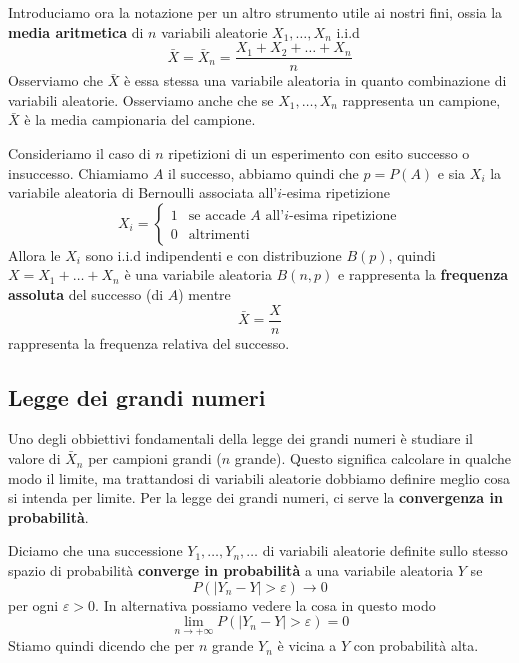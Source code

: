 Introduciamo ora la notazione per un altro strumento utile ai nostri fini, ossia la
\textbf{media aritmetica} di $n$ variabili aleatorie $X_1, \dots, X_n$ i.i.d
\[ \bar{X} = \bar{X}_n = \frac{X_1 + X_2 + \dots + X_n}{n} \]
Osserviamo che $\bar{X}$ è essa stessa una variabile aleatoria in quanto combinazione di
variabili aleatorie. Osserviamo anche che se $X_1, \dots, X_n$ rappresenta un campione,
$\bar{X}$ è la media campionaria del campione.

\begin{example}
	Consideriamo il caso di $n$ ripetizioni di un esperimento con esito successo o insuccesso.
	Chiamiamo $A$ il successo, abbiamo quindi che $p = P(A)$ e sia $X_i$ la variabile aleatoria di
	Bernoulli associata all'$i$-esima ripetizione
	\[
		X_i = \begin{cases}
			1 & \text{se accade $A$ all'$i$-esima ripetizione} \\
			0 & \text{altrimenti}
		\end{cases}
	\]
	Allora le $X_i$ sono i.i.d indipendenti e con distribuzione $B(p)$, quindi $X=X_1+\dots+X_n$ è
	una variabile aleatoria $B(n,p)$ e rappresenta la \textbf{frequenza assoluta} del successo
	(di $A$) mentre
	\[ \bar{X} = \frac{X}{n} \]
	rappresenta la frequenza relativa del successo.
\end{example}

\subsection{Legge dei grandi numeri}
Uno degli obbiettivi fondamentali della legge dei grandi numeri è studiare il valore di
$\bar{X}_n$ per campioni grandi ($n$ grande). Questo significa calcolare in qualche modo il
limite, ma trattandosi di variabili aleatorie dobbiamo definire meglio cosa si intenda per limite.
Per la legge dei grandi numeri, ci serve la \textbf{convergenza in probabilità}.

\begin{definition}
	Diciamo che una successione $Y_1, \dots, Y_n, \dots$ di variabili aleatorie definite sullo
	stesso spazio di probabilità \textbf{converge in probabilità} a una variabile aleatoria $Y$ se
	\[ P(|Y_n - Y| > \varepsilon) \to 0 \]
	per ogni $\varepsilon > 0$. In alternativa possiamo vedere la cosa in questo modo
	\[ \lim_{n \to +\infty} P(|Y_n - Y| > \varepsilon) = 0 \]
	Stiamo quindi dicendo che per $n$ grande $Y_n$ è vicina a $Y$ con probabilità alta.
\end{definition}

